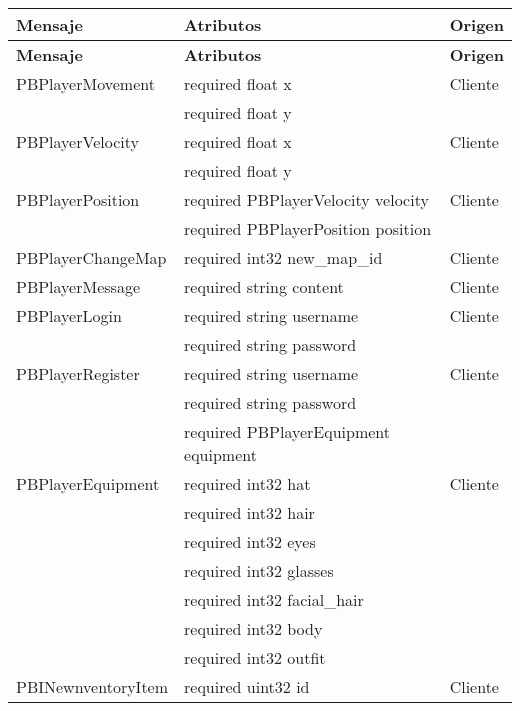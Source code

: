 \label{apendix:protobuf}
\begin{longtable}{|p{}|p{}|p{}|}
    \hline
    \textbf{Mensaje} & \textbf{Atributos} & \textbf{Origen} \\ \hline
    \endfirsthead
    \hline
    \textbf{Mensaje} & \textbf{Atributos} & \textbf{Origen} \\\hline
    \endhead
    \hline
    \endfoot
    \hline
    \endlastfoot
    
    \hline
    PBPlayerMovement & required float x & Cliente \\
                        & required float y & \\
    \hline
    PBPlayerVelocity & required float x & Cliente \\
                        & required float y & \\
    \hline
    PBPlayerPosition & required PBPlayerVelocity velocity & Cliente \\
                        & required PBPlayerPosition position & \\
    \hline
    PBPlayerChangeMap & required int32 new\_map\_id & Cliente \\
    \hline
    PBPlayerMessage & required string content & Cliente \\
    \hline
    PBPlayerLogin & required string username & Cliente \\
                    & required string password & \\
    \hline
    PBPlayerRegister & required string username & Cliente \\
                        & required string password & \\
                        & required PBPlayerEquipment equipment & \\
    \hline
    PBPlayerEquipment & required int32 hat & Cliente \\
                        & required int32 hair & \\
                        & required int32 eyes & \\
                        & required int32 glasses & \\
                        & required int32 facial\_hair & \\
                        & required int32 body & \\
                        & required int32 outfit & \\
    \hline
    PBINewnventoryItem & required uint32 id & Cliente \\

\end{longtable}
